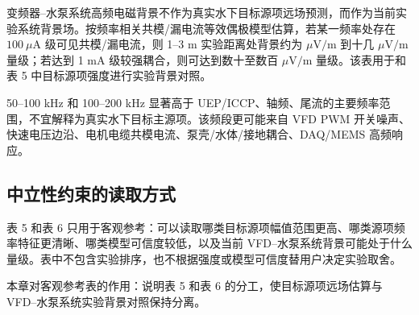 变频器--水泵系统高频电磁背景不作为真实水下目标源项远场预测，而作为当前实验系统背景场。按频率相关共模/漏电流等效偶极模型估算，若某一频率处存在 $100\ \mu\mathrm{A}$ 级可见共模/漏电流，则 1--3 m 实验距离处背景约为 $\mu\mathrm{V/m}$ 到十几 $\mu\mathrm{V/m}$ 量级；若达到 1 mA 级较强耦合，则可达到数十至数百 $\mu\mathrm{V/m}$ 量级。该表用于和表 5 中目标源项强度进行实验背景对照。

50--100 kHz 和 100--200 kHz 显著高于 UEP/ICCP、轴频、尾流的主要频率范围，不宜解释为真实水下目标主源项。该频段更可能来自 VFD PWM 开关噪声、快速电压边沿、电机电缆共模电流、泵壳/水体/接地耦合、DAQ/MEMS 高频响应。

\subsection{中立性约束的读取方式}

表 5 和表 6 只用于客观参考：可以读取哪类目标源项幅值范围更高、哪类源项频率特征更清晰、哪类模型可信度较低，以及当前 VFD--水泵系统背景可能处于什么量级。表中不包含实验排序，也不根据强度或模型可信度替用户决定实验取舍。

本章对客观参考表的作用：说明表 5 和表 6 的分工，使目标源项远场估算与 VFD--水泵系统实验背景对照保持分离。
